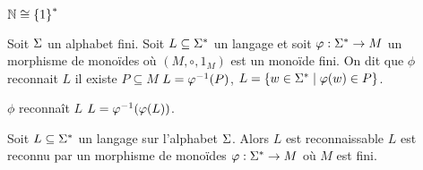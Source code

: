 \begin{remarque}
	$\mathbb{N} \cong \left\{1\right\}^*$
\end{remarque}

\begin{definition}
	Soit $\Sigma$ un alphabet fini. Soit $L \subseteq \Sigma^{*}$ un langage et soit $\varphi : \Sigma^{*} \to M$ un morphisme de monoïdes où $(M, \circ, 1_M)$ est un monoïde fini. On dit que
	$\phi$ reconnait $L$ \ssi il existe $P \subseteq M$ \tq $L = \varphi^{-1} (P)$, \cad $L = \left\{w \in \Sigma^{*} \mid \varphi (w) \in P\right\}$.
\end{definition}

\begin{exercice}
	$\phi$ reconnaît $L$ \ssi $L = \varphi^{-1} (\varphi (L))$.
\end{exercice}

\begin{prop}
	Soit $L \subseteq \Sigma^{*}$ un langage sur l'alphabet $\Sigma$. Alors $L$ est reconnaissable \ssi $L$ est reconnu par un morphisme de monoïdes $\varphi : \Sigma^{*} \to M$ où $M$ est fini.
\end{prop}



